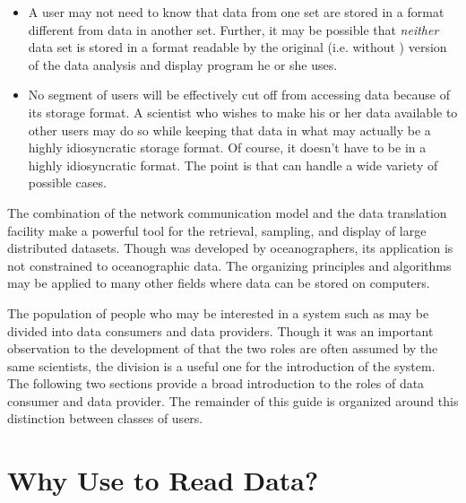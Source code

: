 \begin{itemize}

\item A user may not need to know that data
from one set are stored in a format different from data in another
set. Further, it may be possible that {\em neither} data set is
stored in a format readable by the original (i.e. without \opendap)
version of the data analysis and display program he or she uses.

\item No segment of \opendap users will be effectively cut off from 
accessing data because of its storage format. A scientist who wishes
to make his or her data available to other \opendap users may do so while
keeping that data in what may actually be a highly idiosyncratic
storage format. Of course, it doesn't have to be in a highly
idiosyncratic format.  The point is that \opendap can handle a wide variety
of possible cases.

\end{itemize}

The combination of the \opendap network communication model and the data
translation facility make \opendap a powerful tool for the retrieval,
sampling, and display of large distributed datasets. Though \opendap was
developed by oceanographers, its application is not constrained to
oceanographic data. The organizing principles and algorithms may be
applied to many other fields where data can be stored on computers.

The population of people who may be interested in a system such as
\opendap may be divided into data consumers and data providers. Though it
was an important observation to the development of \opendap that the two
roles are often assumed by the same scientists, the division is a
useful one for the introduction of the system. The following two
sections provide a broad introduction to the roles of data consumer
and data provider. The remainder of this guide is organized around
this distinction between classes of users.

\section{Why Use \opendap to Read Data?}
\label{intro,consumer}

